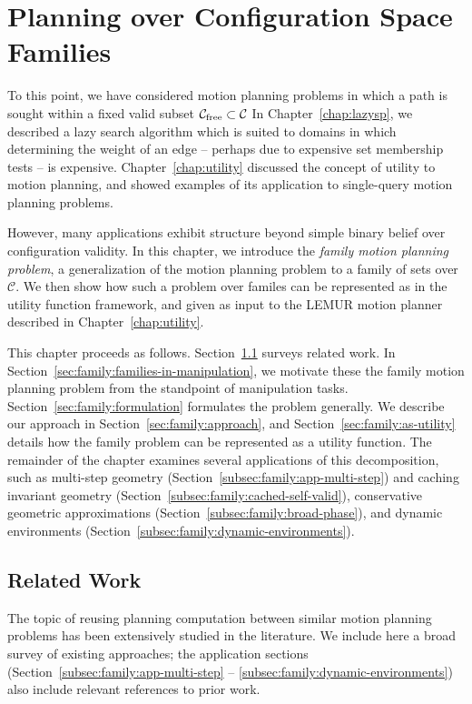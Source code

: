 \chapter{Planning over Configuration Space Families}
\label{chap:family}

To this point,
we have considered motion planning problems in which a path is sought
within a fixed valid subset
$\mathcal{C}_{\mbox{\scriptsize free}} \subset \mathcal{C}$
In Chapter~\ref{chap:lazysp},
we described a lazy search algorithm which is suited to domains in
which determining the weight of an edge
-- perhaps due to expensive set membership tests --
is expensive.
Chapter~\ref{chap:utility} discussed the concept of utility to
motion planning,
and showed examples of its application to single-query motion
planning problems.

However,
many applications exhibit structure beyond simple binary belief over
configuration validity.
In this chapter,
we introduce the \emph{family motion planning problem},
a generalization of the motion planning problem to a family of sets
over $\mathcal{C}$.
We then show how such a problem over familes can be represented
as in the utility function framework,
and given as input to the LEMUR motion planner described
in Chapter~\ref{chap:utility}.

This chapter proceeds as follows.
Section~\ref{sec:family:related-work} surveys related work.
In Section~\ref{sec:family:families-in-manipulation},
we motivate these the family motion planning problem
from the standpoint of manipulation tasks.
Section~\ref{sec:family:formulation} formulates the problem
generally.
We describe our approach in Section~\ref{sec:family:approach},
and Section~\ref{sec:family:as-utility} details how the family
problem can be represented as a utility function.
The remainder of the chapter examines several applications
of this decomposition,
such as multi-step geometry
(Section~\ref{subsec:family:app-multi-step})
and caching invariant geometry
(Section~\ref{subsec:family:cached-self-valid}),
conservative geometric approximations
(Section~\ref{subsec:family:broad-phase}),
and dynamic environments
(Section~\ref{subsec:family:dynamic-environments}).

\section{Related Work}
\label{sec:family:related-work}

The topic of reusing planning computation
between similar motion planning problems
has been extensively studied in the literature.
We include here a broad survey of existing approaches;
the application sections
(Section~\ref{subsec:family:app-multi-step}
-- \ref{subsec:family:dynamic-environments}) also include
relevant references to prior work.

